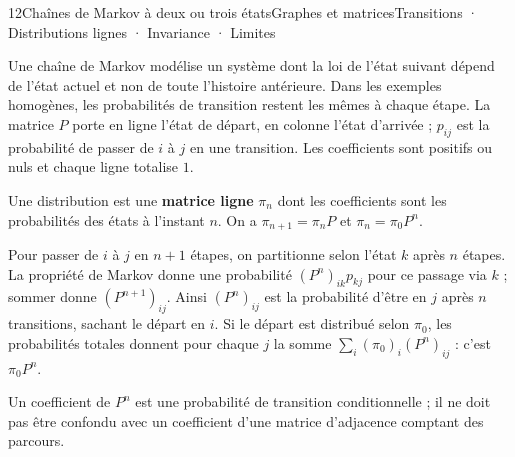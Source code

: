 \begin{ouverture}[conditionnelles]{12}{Chaînes de Markov à deux ou trois états}{Graphes et matrices}{Transitions · Distributions lignes · Invariance · Limites}
\end{ouverture}
\essentiel

Une chaîne de Markov modélise un système dont la loi de l'état suivant dépend de l'état actuel et non de toute l'histoire antérieure. Dans les exemples homogènes, les probabilités de transition restent les mêmes à chaque étape.
La matrice $P$ porte en ligne l'état de départ, en colonne l'état d'arrivée ; $p_{ij}$ est la probabilité de passer de $i$ à $j$ en une transition.
Les coefficients sont positifs ou nuls et chaque ligne totalise $1$.
\begin{definition}
Une distribution est une \textbf{matrice ligne} $\pi_n$ dont les coefficients sont les probabilités des états à l'instant $n$.
On a $\pi_{n+1}=\pi_nP$ et $\pi_n=\pi_0P^n$.
\end{definition}
\begin{demonstration}
Pour passer de $i$ à $j$ en $n+1$ étapes, on partitionne selon l'état $k$ après $n$ étapes.
La propriété de Markov donne une probabilité $(P^n)_{ik}p_{kj}$ pour ce passage via $k$ ; sommer donne $(P^{n+1})_{ij}$.
Ainsi $(P^n)_{ij}$ est la probabilité d'être en $j$ après $n$ transitions, sachant le départ en $i$.
Si le départ est distribué selon $\pi_0$, les probabilités totales donnent pour chaque $j$ la somme $\sum_i(\pi_0)_i(P^n)_{ij}$ : c'est $\pi_0P^n$.
\end{demonstration}
Un coefficient de $P^n$ est une probabilité de transition conditionnelle ; il ne doit pas être confondu avec un coefficient d'une matrice d'adjacence comptant des parcours.
